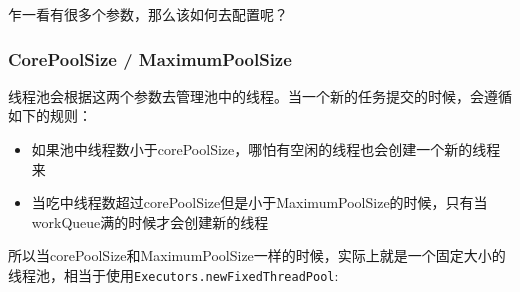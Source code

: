 \documentclass[12pt]{article}
\begin{document}
\begin{Shaded}
\begin{Highlighting}[]
 \OperatorTok{(}\OperatorTok{,}
                            \OperatorTok{,}
                            \OperatorTok{,}
                            \OperatorTok{,}
                            \OperatorTok{\textless{}}\OperatorTok{\textgreater{}}\OperatorTok{)} \OperatorTok{\{}
    \OperatorTok{(}\OperatorTok{,}\OperatorTok{,}\OperatorTok{,}\OperatorTok{,}\OperatorTok{,}
            \OperatorTok{(),}\OperatorTok{);}
\OperatorTok{\}}
\end{Highlighting}
\end{Shaded}

乍一看有很多个参数，那么该如何去配置呢？

\subsubsection{CorePoolSize / MaximumPoolSize}\label{corepoolsize-maximumpoolsize}

线程池会根据这两个参数去管理池中的线程。当一个新的任务提交的时候，会遵循如下的规则：

\begin{itemize}
\tightlist
\item
  如果池中线程数小于corePoolSize，哪怕有空闲的线程也会创建一个新的线程来
\item
  当吃中线程数超过corePoolSize但是小于MaximumPoolSize的时候，只有当workQueue满的时候才会创建新的线程
\end{itemize}

所以当corePoolSize和MaximumPoolSize一样的时候，实际上就是一个固定大小的线程池，相当于使用\texttt{Executors.newFixedThreadPool}:

\begin{Shaded}
\begin{Highlighting}[]
   \OperatorTok{(}\OperatorTok{)} \OperatorTok{\{}
      \OperatorTok{(}\OperatorTok{,}\OperatorTok{,}
                                  \OperatorTok{,} \OperatorTok{,}
                                   \OperatorTok{\textless{}}\OperatorTok{\textgreater{}());}
\OperatorTok{\}}
\end{Highlighting}
\end{Shaded}
\end{document}
